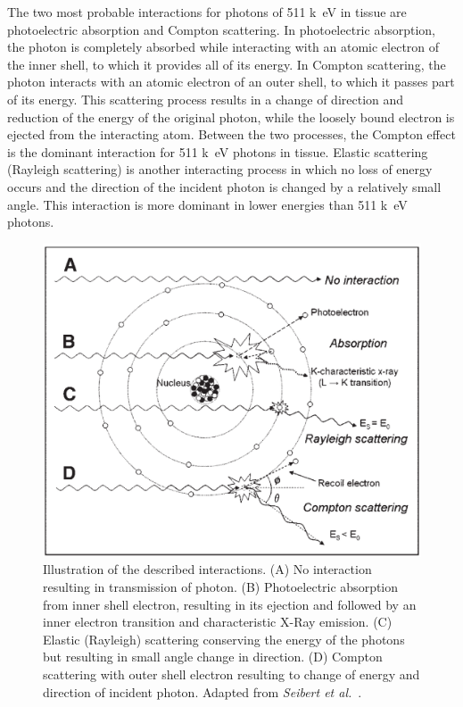 The two most probable interactions for photons of 511 \si{k\electronvolt} in tissue are photoelectric absorption and Compton scattering. In photoelectric absorption, the photon is completely absorbed while interacting with an atomic electron of the inner shell, to which it provides all of its energy. In Compton scattering, the photon interacts with an atomic electron of an outer shell, to which it passes part of its energy. This scattering process results in a change of direction and reduction of the energy of the original photon, while the loosely bound electron is ejected from the interacting atom. Between the two processes, the Compton effect is the dominant interaction for 511 \si{k\electronvolt} photons in tissue. Elastic scattering (Rayleigh scattering) is another interacting process in which no loss of energy occurs and the direction of the incident photon is changed by a relatively small angle. This interaction is more dominant in lower energies than 511 \si{k\electronvolt} photons.
%
\begin{figure} [h!]
\centering
\includegraphics[scale=0.45,angle=0]{2_Theory_Methods/figures/Interactions.pdf}
\caption{Illustration of the described interactions. (A) No interaction resulting in transmission of photon. (B) Photoelectric absorption from inner shell electron, resulting in its ejection and followed by an inner electron transition and characteristic X-Ray emission. (C) Elastic (Rayleigh) scattering conserving the energy of the photons but resulting in small angle change in direction. (D) Compton scattering with outer shell electron resulting to change of energy and direction of incident photon. Adapted from \textit{Seibert et al.}~\cite{Seibert2005}.} 
\label{fig_2:511_interactions}
\end{figure} 
%
